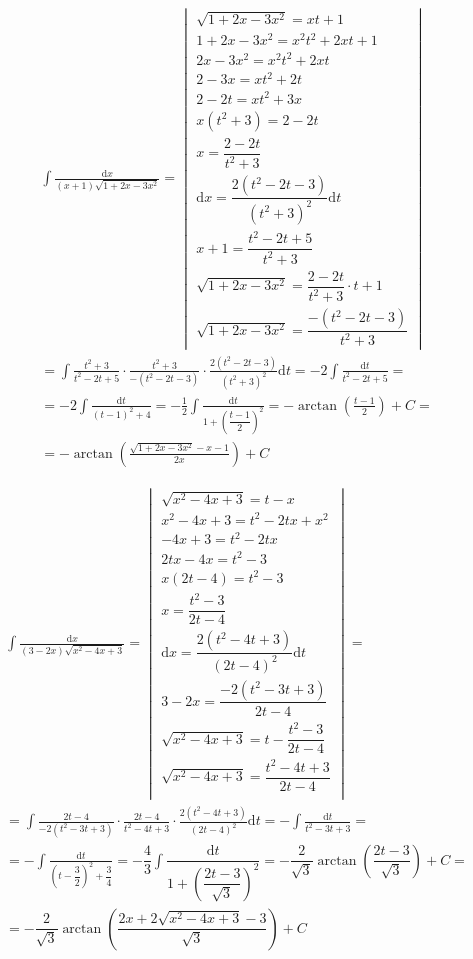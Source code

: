 
\begin{gather*}
\int{\frac{\mbox{d}x}{(x+1)\sqrt{1+2x-3x^2}}} =
\begin{vmatrix}
  \sqrt{1+2x-3x^2}=xt+1\\
  1+2x-3x^2=x^2t^2+2xt+1\\
  2x-3x^2=x^2t^2+2xt\\
  2-3x=xt^2+2t\\
  2-2t=xt^2+3x\\
  x(t^2+3)=2-2t\\
  x=\dfrac{2-2t}{t^2+3}\\
  \mbox{d}x=\dfrac{2(t^2-2t-3)}{(t^2+3)^{2}}\mbox{d}t\\
  x+1=\dfrac{t^2-2t+5}{t^2+3}\\
  \sqrt{1+2x-3x^2} = \dfrac{2-2t}{t^2+3} \cdot t+1 \\
  \sqrt{1+2x-3x^2} = \dfrac{-(t^2-2t-3)}{t^2+3}
\end{vmatrix} \\
= \int{\frac{t^2+3}{t^2-2t+5} \cdot \frac{t^2+3}{-(t^2-2t-3)} \cdot \frac{2(t^2-2t-3)}{(t^2+3)^{2}}\mbox{d}t}
= -2\int{\frac{\mbox{d}t}{t^2-2t+5}} = \\
= -2\int{\frac{\mbox{d}t}{(t-1)^2+4}}
= -\frac{1}{2}\int{\frac{\mbox{d}t}{1+\left(\dfrac{t-1}{2}\right)^2}}
= -\arctan{\left(\frac{t-1}{2}\right)}+C = \\
= -\arctan{\left(\frac{\sqrt{1+2x-3x^2}-x-1}{2x}\right)} + C
\end{gather*}


\begin{gather*}
\int{\frac{\mbox{d}x}{(3-2x)\sqrt{x^2-4x+3}}} =
\begin{vmatrix}
  \sqrt{x^2-4x+3}=t-x\\
  x^2-4x+3=t^2-2tx+x^2\\
  -4x+3=t^2-2tx\\
  2tx-4x=t^2-3\\
  x(2t-4)=t^2-3\\
  x=\dfrac{t^2-3}{2t-4}\\
  \mbox{d}x=\dfrac{2(t^2-4t+3)}{(2t-4)^{2}}\mbox{d}t\\
  3-2x = \dfrac{-2(t^2-3t+3)}{2t-4}\\
  \sqrt{x^2-4x+3} = t-\dfrac{t^2-3}{2t-4} \\
  \sqrt{x^2-4x+3} = \dfrac{t^2-4t+3}{2t-4}\\
\end{vmatrix} = \\
= \int{\frac{2t-4}{-2(t^2-3t+3)} \cdot \frac{2t-4}{t^2-4t+3} \cdot \frac{2(t^2-4t+3)}{(2t-4)^{2}}\mbox{d}t}
= -\int{\frac{\mbox{d}t}{t^2-3t+3}} = \\
= -\int{\frac{\mbox{d}t}{\left(t-\dfrac{3}{2}\right)^2+\dfrac{3}{4}}}
= -\dfrac{4}{3}\int{\dfrac{\mbox{d}t}{1+\left(\dfrac{2t-3}{\sqrt{3}}\right)^2}}
= -\dfrac{2}{\sqrt{3}}\arctan{\left(\dfrac{2t-3}{\sqrt{3}}\right)}+C =\\
= -\dfrac{2}{\sqrt{3}}\arctan{\left(\dfrac{2x+2\sqrt{x^2-4x+3}-3}{\sqrt{3}}\right)}+C
\end{gather*}


